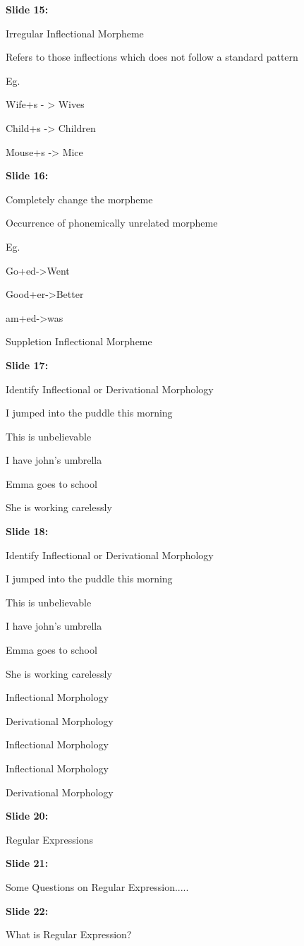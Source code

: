 \documentclass[11pt,a4paper]{article}
\begin{document}
\textbf{Slide 15:}

Irregular Inflectional  Morpheme

Refers to those inflections which does not follow a standard pattern

Eg.

Wife+s - >  Wives

Child+s  ->  Children

Mouse+s   ->   Mice

\textbf{Slide 16:}

Completely change the morpheme

Occurrence of phonemically unrelated morpheme

Eg.

Go+ed->Went

Good+er->Better

am+ed->was

Suppletion Inflectional  Morpheme

\textbf{Slide 17:}

Identify Inflectional or Derivational Morphology

I jumped into the puddle this morning

This is unbelievable

I have john’s umbrella

Emma goes to school

She is working carelessly

\textbf{Slide 18:}

Identify Inflectional or Derivational Morphology

I jumped into the puddle this morning

This is unbelievable

I have john’s umbrella

Emma goes to school

She is working carelessly

Inflectional Morphology

Derivational Morphology

Inflectional Morphology

Inflectional Morphology

Derivational Morphology

\textbf{Slide 20:}

Regular Expressions

\textbf{Slide 21:}

Some Questions on Regular Expression.....

\textbf{Slide 22:}

What is Regular Expression?
\end{document}
